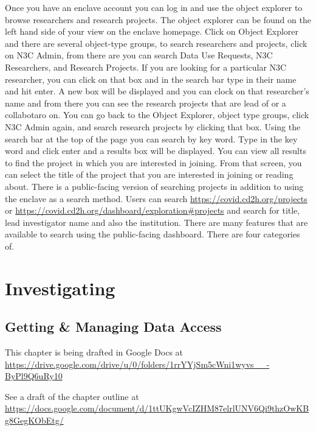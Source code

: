\documentclass[
  letterpaper,
  DIV=11,
  numbers=noendperiod]{scrreprt}
\begin{document}
Once you have an enclave account you can log in and use the object
explorer to browse researchers and research projects. The object
explorer can be found on the left hand side of your view on the enclave
homepage. Click on Object Explorer and there are several object-type
groups, to search researchers and projects, click on N3C Admin, from
there are you can search Data Use Requests, N3C Researchers, and
Research Projects. If you are looking for a particular N3C researcher,
you can click on that box and in the search bar type in their name and
hit enter. A new box will be displayed and you can clock on that
researcher's name and from there you can see the research projects that
are lead of or a collabotaro on. You can go back to the Object Explorer,
object type groups, click N3C Admin again, and search research projects
by clicking that box. Using the search bar at the top of the page you
can search by key word. Type in the key word and click enter and a
results box will be displayed. You can view all results to find the
project in which you are interested in joining. From that screen, you
can select the title of the project that you are interested in joining
or reading about. There is a public-facing version of searching projects
in addition to using the enclave as a search method. Users can search
\url{https://covid.cd2h.org/projects} or
\url{https://covid.cd2h.org/dashboard/exploration\#projects} and search
for title, lead investigator name and also the institution. There are
many features that are available to search using the public-facing
dashboard. There are four categories of.

\part{Investigating}

\hypertarget{sec-data-access}{%
\chapter{Getting \& Managing Data Access}\label{sec-data-access}}

\begin{tcolorbox}[enhanced jigsaw, rightrule=.15mm, colback=white, leftrule=.75mm, breakable, left=2mm, bottomtitle=1mm, opacityback=0, toprule=.15mm, colframe=quarto-callout-note-color-frame, titlerule=0mm, toptitle=1mm, coltitle=black, title=\textcolor{quarto-callout-note-color}{\faInfo}\hspace{0.5em}{Note}, bottomrule=.15mm, arc=.35mm, opacitybacktitle=0.6, colbacktitle=quarto-callout-note-color!10!white]

This chapter is being drafted in Google Docs at
\url{https://drive.google.com/drive/u/0/folders/1rrYYjSm5cWni1wyvs__-ByPl9Q6uRy10}

See a draft of the chapter outline at
\url{https://docs.google.com/document/d/1ttUKgwVcIZHM87elrlUNV6Qi9thzOwKBg8GegKObEtg/}

\end{tcolorbox}
\end{document}
